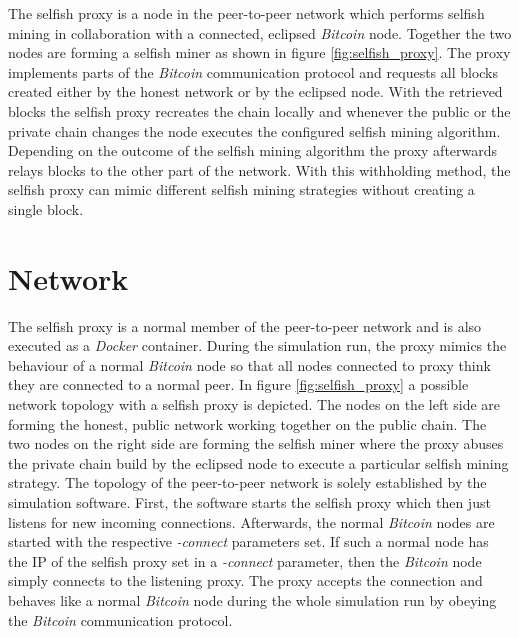 The selfish proxy is a node in the peer-to-peer network which performs selfish mining in collaboration with a connected, eclipsed \textit{Bitcoin} node.
Together the two nodes are forming a selfish miner as shown in figure \ref{fig:selfish_proxy}.
The proxy implements parts of the \textit{Bitcoin} communication protocol and requests all blocks created either by the honest network or by the eclipsed node.
With the retrieved blocks the selfish proxy recreates the chain locally and whenever the public or the private chain changes the node executes the configured selfish mining algorithm.
Depending on the outcome of the selfish mining algorithm the proxy afterwards relays blocks to the other part of the network.
With this withholding method, the selfish proxy can mimic different selfish mining strategies without creating a single block.

\section{Network}

The selfish proxy is a normal member of the peer-to-peer network and is also executed as a \textit{Docker} container.
During the simulation run, the proxy mimics the behaviour of a normal \textit{Bitcoin} node so that all nodes connected to proxy think they are connected to a normal peer.
In figure \ref{fig:selfish_proxy} a possible network topology with a selfish proxy is depicted.
The nodes on the left side are forming the honest, public network working together on the public chain.
The two nodes on the right side are forming the selfish miner where the proxy abuses the private chain build by the eclipsed node to execute a particular selfish mining strategy.
The topology of the peer-to-peer network is solely established by the simulation software.
First, the software starts the selfish proxy which then just listens for new incoming connections.
Afterwards, the normal \textit{Bitcoin} nodes are started with the respective \textit{-connect} parameters set.
If such a normal node has the IP of the selfish proxy set in a \textit{-connect} parameter, then the \textit{Bitcoin} node simply connects to the listening proxy.
The proxy accepts the connection and behaves like a normal \textit{Bitcoin} node during the whole simulation run by obeying the \textit{Bitcoin} communication protocol.

